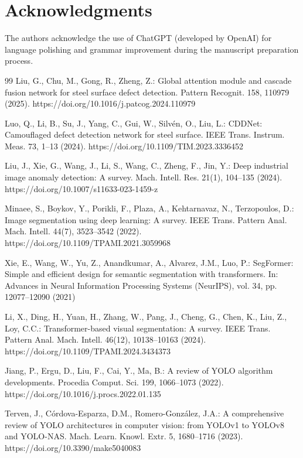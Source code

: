 \documentclass[sn-basic]{sn-jnl}
\theoremstyle{thmstyleone}%
\theoremstyle{thmstyletwo}%
\theoremstyle{thmstylethree}%
\begin{document}
 \section{Acknowledgments}\label{sec5}
The authors acknowledge the use of ChatGPT (developed by OpenAI) for language
 polishing and grammar improvement during the manuscript preparation process.

\clearpage


\begin{thebibliography}{99}
 Liu, G., Chu, M., Gong, R., Zheng, Z.: Global attention module and cascade fusion network for steel surface defect detection. Pattern Recognit. 158, 110979 (2025). https://doi.org/10.1016/j.patcog.2024.110979

 Luo, Q., Li, B., Su, J., Yang, C., Gui, W., Silvén, O., Liu, L.: CDDNet: Camouflaged defect detection network for steel surface. IEEE Trans. Instrum. Meas. 73, 1–13 (2024). https://doi.org/10.1109/TIM.2023.3336452

 Liu, J., Xie, G., Wang, J., Li, S., Wang, C., Zheng, F., Jin, Y.: Deep industrial image anomaly detection: A survey. Mach. Intell. Res. 21(1), 104–135 (2024). https://doi.org/10.1007/s11633-023-1459-z

 Minaee, S., Boykov, Y., Porikli, F., Plaza, A., Kehtarnavaz, N., Terzopoulos, D.: Image segmentation using deep learning: A survey. IEEE Trans. Pattern Anal. Mach. Intell. 44(7), 3523–3542 (2022). https://doi.org/10.1109/TPAMI.2021.3059968

 Xie, E., Wang, W., Yu, Z., Anandkumar, A., Alvarez, J.M., Luo, P.: SegFormer: Simple and efficient design for semantic segmentation with transformers. In: Advances in Neural Information Processing Systems (NeurIPS), vol. 34, pp. 12077–12090 (2021)

 Li, X., Ding, H., Yuan, H., Zhang, W., Pang, J., Cheng, G., Chen, K., Liu, Z., Loy, C.C.: Transformer-based visual segmentation: A survey. IEEE Trans. Pattern Anal. Mach. Intell. 46(12), 10138–10163 (2024). https://doi.org/10.1109/TPAMI.2024.3434373

 Jiang, P., Ergu, D., Liu, F., Cai, Y., Ma, B.: A review of YOLO algorithm developments. Procedia Comput. Sci. 199, 1066–1073 (2022). https://doi.org/10.1016/j.procs.2022.01.135

 Terven, J., Córdova-Esparza, D.M., Romero-González, J.A.: A comprehensive review of YOLO architectures in computer vision: from YOLOv1 to YOLOv8 and YOLO-NAS. Mach. Learn. Knowl. Extr. 5, 1680–1716 (2023). https://doi.org/10.3390/make5040083


\end{thebibliography}
\end{document}
